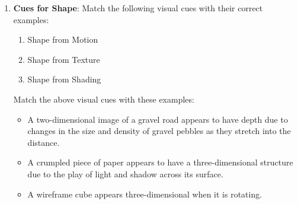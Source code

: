 \documentclass[11pt,letterpaper]{article}
\begin{document}
\begin{enumerate}
    \item \textbf{Cues for Shape}: Match the following visual cues with their correct examples:
    \begin{enumerate}
        \item Shape from Motion
        \item Shape from Texture
        \item Shape from Shading
    \end{enumerate}

    Match the above visual cues with these examples:
    \begin{itemize}
        \item \underline{\hspace{1.5 cm}} A two-dimensional image of a gravel road appears to have depth due to changes in the size and density of gravel pebbles as they stretch into the distance.
        \item \underline{\hspace{1.5 cm}} A crumpled piece of paper appears to have a three-dimensional structure due to the play of light and shadow across its surface.
        \item \underline{\hspace{1.5 cm}} A wireframe cube appears three-dimensional when it is rotating.
    \end{itemize}

    


    

\end{enumerate}
\end{document}
